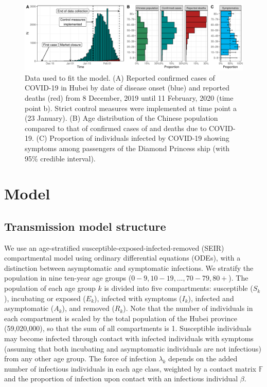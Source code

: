 \documentclass{article}
\begin{document}
	\begin{figure}[H]
		\centering
		\includegraphics[width=.9\linewidth]{../figures/fig_desc.pdf}
		\caption{Data used to fit the model. (A) Reported confirmed cases of COVID-19 in Hubei by date of disease onset (blue) and reported deaths (red) from 8 December, 2019 until 11 February, 2020 (time point b). Strict control measures were implemented at time point a (23 January). (B) Age distribution of the Chinese population compared to that of confirmed cases of and deaths due to COVID-19. (C) Proportion of individuals infected by COVID-19 showing symptoms among passengers of the Diamond Princess ship (with 95\% credible interval).}
		\label{fig:data}
	\end{figure}
	
	\newpage
	
	\section{Model}
	
	\subsection{Transmission model structure}
	
	We use an age-stratified susceptible-exposed-infected-removed (SEIR) compartmental model using ordinary differential equations (ODEs), with a distinction between asymptomatic and symptomatic infections. 
	We stratify the population in nine ten-year age groups ($0-9, 10-19, \ldots, 70-79, 80+$). 
	The population of each age group $k$ is divided into five compartments: susceptible ($S_k$), incubating or exposed ($E_k$), infected with symptoms ($I_k$), infected and asymptomatic ($A_k$), and removed ($R_k$).
	Note that the number of individuals in each compartment is scaled by the total population of the Hubei province (59,020,000), so that the sum of all compartments is 1.
	Susceptible individuals may become infected through contact with infected individuals with symptoms (assuming that both incubating and asymptomatic individuals are not infectious) from any other age group.
	The force of infection $\lambda_k$ depends on the added number of infectious individuals in each age class, weighted by a contact matrix $\mathds{F}$ and the proportion of infection upon contact with an infectious individual $\beta$.
	
\end{document}
